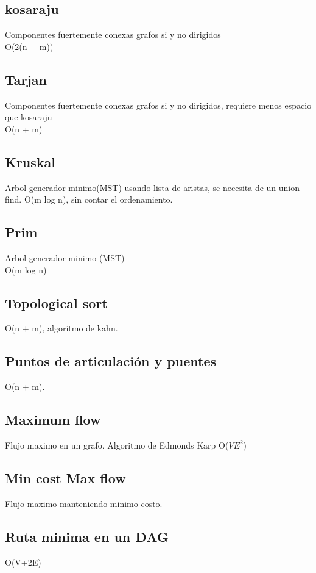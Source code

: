 \documentclass[10pt,landscape,twocolumn,letterpaper,twosided]{article}
\newcommand\cppfile[2][]{

}
\begin{document}
			\subsection{kosaraju}
			Componentes fuertemente conexas grafos si y no dirigidos\\
			O(2(n + m))
			\cppfile[9-36]{grafos/kosaraju.cpp}
			\subsection{Tarjan}
			Componentes fuertemente conexas grafos si y no dirigidos, requiere menos
			espacio que kosaraju\\
			O(n + m)
			\cppfile[9-39]{grafos/tarjan.cpp}
			\subsection{Kruskal}
			Arbol generador minimo(MST) usando lista de aristas, se necesita de un union-find.
			O(m log n), sin contar el ordenamiento.
			\cppfile[38-57]{grafos/kruskal.cpp}
			\subsection{Prim}
			Arbol generador minimo (MST)\\
			O(m log n)
			\cppfile[10-34]{grafos/prim.cpp}
			\subsection{Topological sort}%
			O(n + m), algoritmo de kahn.
			\cppfile[7-26]{grafos/topological_sort_para_grafos_ciclicos.cpp}
			\subsection{Puntos de articulación y puentes}
			O(n + m).
			\cppfile[10-48]{grafos/puntos_de_articulacion_y_puentes.cpp}
			\subsection{Maximum flow}%
			Flujo maximo en un grafo. Algoritmo de Edmonds Karp O(${VE}^{2}$)
			\cppfile[12-53]{grafos/Edmonds_karp.cpp}
			\subsection{Min cost Max flow}
			Flujo maximo manteniendo minimo costo.
			\cppfile[6-59]{grafos/min_cost_max_flow.cpp}
			\subsection{Ruta minima en un DAG}
			O(V+2E)
			\cppfile[12-44]{grafos/ruta_minima_DAG.cpp}
\end{document}
